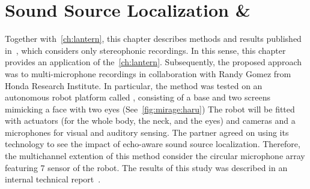 \chapter{Sound Source Localization \& }\label{ch:mirage}


 \synopsisChMirage

\mynewline
Together with~\cref{ch:lantern}, this chapter describes methods and results published in~\cite{di2019mirage}, which considers only stereophonic recordings.
In this sense, this chapter provides an application of the~\cref{ch:lantern}.
Subsequently, the proposed approach was to multi-microphone recordings in collaboration with Randy Gomez from Honda Research Institute.
In particular, the method was tested on an autonomous robot platform called , consisting of a base and two screens mimicking a face with two eyes (See~\cref{fig:mirage:haru})
The robot will be fitted with actuators (for the whole body, the neck, and the eyes) and cameras and a microphones for visual and auditory sensing.
The partner agreed on using its technology to see the impact of echo-aware sound source localization.
Therefore, the multichannel extention of this method consider the circular microphone array featuring 7 sensor of the  robot.
The results of this study was described in an internal technical report~.


